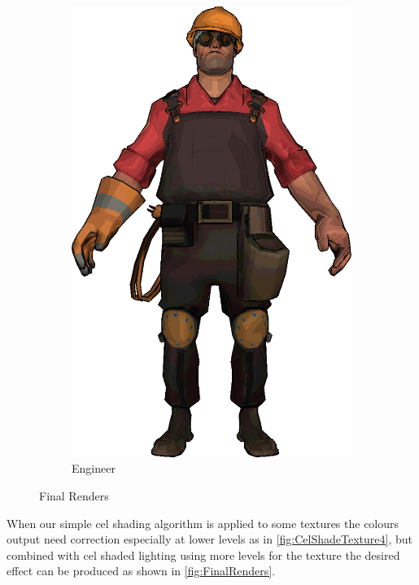 \begin{figure}[h]
\begin{subfigure}[b]{0.18\textwidth}
        \includegraphics[width=\textwidth]{img/Combined/FinalEngineer.png}
        \caption{Engineer}
 		\label{fig:FinalEngineer}
\end{subfigure}
\caption{Final Renders}
 \label{fig:FinalRenders}
\end{figure} 

When our simple cel shading algorithm is applied to some textures the colours output need correction especially 
at lower levels as in \autoref{fig:CelShadeTexture4}, but combined with cel shaded lighting using more levels for the 
texture the desired effect can be produced as shown in \autoref{fig:FinalRenders}. 

